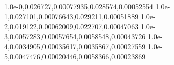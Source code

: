 1.0e-0,0.026727,0.00077935,0.028574,0.00052554
1.0e-1,0.027101,0.00076643,0.029211,0.00051889
1.0e-2,0.019122,0.00062009,0.022707,0.00047063
1.0e-3,0.0057283,0.00057654,0.0058548,0.00043726
1.0e-4,0.0034905,0.00035617,0.0035867,0.00027559
1.0e-5,0.0047476,0.00020446,0.0058366,0.00023869